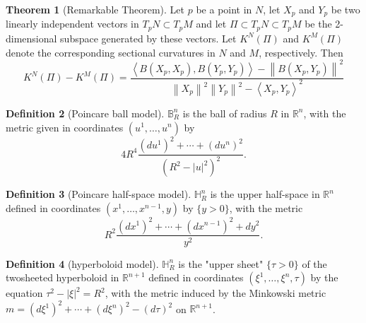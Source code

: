 \documentclass[12pt,a4paper]{book}
\newcommand{\bb}[1]{\mathbb{#1}}
\theoremstyle{definition}
\newtheorem{defn}{Definition}[section]
\newtheorem{theo}[defn]{Theorem}
\begin{document}
\begin{theo}[Remarkable Theorem]
    Let $p$ be a point in $N$, let $X_p$ and $Y_p$ be two linearly independent vectors in $T_p N \subset T_p M$ and let $\Pi \subset T_p N \subset T_p M$ be the 2-dimensional subspace generated by these vectors. Let $K^N(\Pi)$ and $K^M(\Pi)$ denote the corresponding sectional curvatures in $N$ and $M$, respectively. Then
    $$
        K^N(\Pi)-K^M(\Pi)=\frac{\left\langle B\left(X_p, X_p\right), B\left(Y_p, Y_p\right)\right\rangle-\left\|B\left(X_p, Y_p\right)\right\|^2}{\left\|X_p\right\|^2\left\|Y_p\right\|^2-\left\langle X_p, Y_p\right\rangle^2}
    $$
\end{theo}
\begin{defn}[Poincare ball model]
    $\mathbb{B}_R^n$ is the ball of radius $R$ in $\bb{R}^n$, with the metric given in coordinates $\left(u^1, \ldots, u^n\right)$ by
    $$
        4R^4 \frac{\left(d u^1\right)^2+\cdots+\left(d u^n\right)^2}{\left(R^2-|u|^2\right)^2} .
    $$
\end{defn}
\begin{defn}[Poincare half-space model]
    $\mathbb{H}_R^n$ is the upper half-space in $\bb{R}^n$ defined in coordinates $\left(x^1, \ldots, x^{n-1}, y\right)$ by $\{y>0\}$, with the metric
    $$
        R^2 \frac{\left(d x^1\right)^2+\cdots+\left(d x^{n-1}\right)^2+d y^2}{y^2} .
    $$
\end{defn}
\begin{defn}[hyperboloid model]
    $\mathbb{H}_R^n$ is the "upper sheet" $\{\tau>0\}$ of the twosheeted hyperboloid in $\mathbb{R}^{n+1}$ defined in coordinates $\left(\xi^1, \ldots, \xi^n, \tau\right)$ by the equation $\tau^2-|\xi|^2=R^2$, with the metric
    induced by the Minkowski metric $m=\left(d \xi^1\right)^2+\cdots+\left(d \xi^n\right)^2-(d \tau)^2$ on $\mathbb{R}^{n+1}$.
\end{defn}
\end{document}
